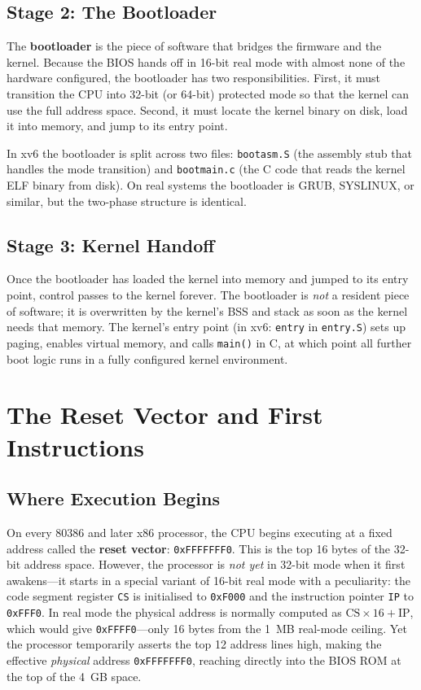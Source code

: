 \documentclass[11pt]{article}
\begin{document}
\subsection{Stage 2: The Bootloader}

The \textbf{bootloader} is the piece of software that bridges the firmware and the kernel.
Because the BIOS hands off in 16-bit real mode with almost none of the hardware configured,
the bootloader has two responsibilities. First, it must transition the CPU into 32-bit
(or 64-bit) protected mode so that the kernel can use the full address space. Second, it must
locate the kernel binary on disk, load it into memory, and jump to its entry point.

In xv6 the bootloader is split across two files: \texttt{bootasm.S} (the assembly stub that
handles the mode transition) and \texttt{bootmain.c} (the C code that reads the kernel ELF
binary from disk). On real systems the bootloader is GRUB, SYSLINUX, or similar, but the
two-phase structure is identical.

\subsection{Stage 3: Kernel Handoff}

Once the bootloader has loaded the kernel into memory and jumped to its entry point, control
passes to the kernel forever. The bootloader is \emph{not} a resident piece of software;
it is overwritten by the kernel's BSS and stack as soon as the kernel needs that memory.
The kernel's entry point (in xv6: \texttt{entry} in \texttt{entry.S}) sets up paging, enables
virtual memory, and calls \texttt{main()} in C, at which point all further boot logic runs in
a fully configured kernel environment.

\section{The Reset Vector and First Instructions}

\subsection{Where Execution Begins}

On every 80386 and later x86 processor, the CPU begins executing at a fixed address called
the \textbf{reset vector}: \texttt{0xFFFFFFF0}. This is the top 16 bytes of the 32-bit
address space. However, the processor is \emph{not yet} in 32-bit mode when it first
awakens---it starts in a special variant of 16-bit real mode with a peculiarity: the code
segment register \texttt{CS} is initialised to \texttt{0xF000} and the instruction pointer
\texttt{IP} to \texttt{0xFFF0}. In real mode the physical address is normally computed as
$\text{CS} \times 16 + \text{IP}$, which would give \texttt{0xFFFF0}---only 16 bytes from
the 1~MB real-mode ceiling. Yet the processor temporarily asserts the top 12 address lines
high, making the effective \emph{physical} address \texttt{0xFFFFFFF0}, reaching directly into
the BIOS ROM at the top of the 4~GB space.
\end{document}

